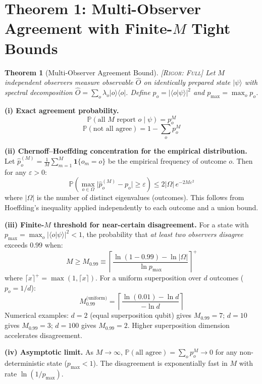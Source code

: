 \documentclass[11pt,a4paper]{article}
\newcommand{\bra}[1]{\langle #1|}
\newcommand{\ket}[1]{|#1\rangle}
\newcommand{\braket}[1]{\langle #1 \rangle}
\newtheorem{theorem}{Theorem}[section]
\theoremstyle{definition}
\theoremstyle{remark}
\newcommand{\Pbb}{\mathbb{P}}
\newcommand{\rigorFull}{\textsc{[Rigor: Full]}}
\begin{document}
\section{Theorem 1: Multi-Observer Agreement with Finite-$M$ Tight Bounds}

\begin{theorem}[Multi-Observer Agreement Bound]
\label{thm:agreement}
\rigorFull
Let $M$ independent observers measure observable $\hat{O}$ on identically prepared state $\ket{\psi}$ with spectral decomposition $\hat{O} = \sum_{o} \lambda_o \ket{o}\bra{o}$. Define $p_o = |\braket{o|\psi}|^2$ and $p_{\max} = \max_o p_o$.
\end{theorem}

\medskip
\noindent\textbf{(i) Exact agreement probability.}
\[
\Pbb(\text{all } M \text{ report } o \mid \psi) = p_o^{M}
\]
\[
\Pbb(\text{not all agree}) = 1 - \sum_{o} p_o^{M}
\]

\noindent\textbf{(ii) Chernoff--Hoeffding concentration for the empirical distribution.}
Let $\hat{p}_o^{(M)} = \frac{1}{M}\sum_{m=1}^{M} \mathbf{1}\{o_m = o\}$ be the empirical frequency of outcome $o$. Then for any $\varepsilon > 0$:
\[
\Pbb\!\left(\max_{o \in \Omega} \bigl|\hat{p}_o^{(M)} - p_o\bigr| \geq \varepsilon\right) \leq 2|\Omega|\, e^{-2M\varepsilon^2}
\]
where $|\Omega|$ is the number of distinct eigenvalues (outcomes). This follows from Hoeffding's inequality applied independently to each outcome and a union bound.

\noindent\textbf{(iii) Finite-$M$ threshold for near-certain disagreement.}
For a state with $p_{\max} = \max_o |\braket{o|\psi}|^2 < 1$, the probability that \emph{at least two observers disagree} exceeds $0.99$ when:
\[
M \geq M_{0.99} \equiv \left\lceil \frac{\ln(1 - 0.99) - \ln|\Omega|}{\ln p_{\max}} \right\rceil^{+}
\]
where $\lceil x \rceil^{+} = \max(1, \lceil x \rceil)$. For a uniform superposition over $d$ outcomes ($p_o = 1/d$):
\[
M_{0.99}^{\text{(uniform)}} = \left\lceil \frac{\ln(0.01) - \ln d}{-\ln d} \right\rceil
\]
Numerical examples: $d=2$ (equal superposition qubit) gives $M_{0.99} = 7$; $d=10$ gives $M_{0.99} = 3$; $d=100$ gives $M_{0.99} = 2$. Higher superposition dimension accelerates disagreement.

\noindent\textbf{(iv) Asymptotic limit.}
As $M \to \infty$, $\Pbb(\text{all agree}) = \sum_o p_o^{M} \to 0$ for any non-deterministic state ($p_{\max} < 1$). The disagreement is exponentially fast in $M$ with rate $\ln(1/p_{\max})$.
\end{document}
